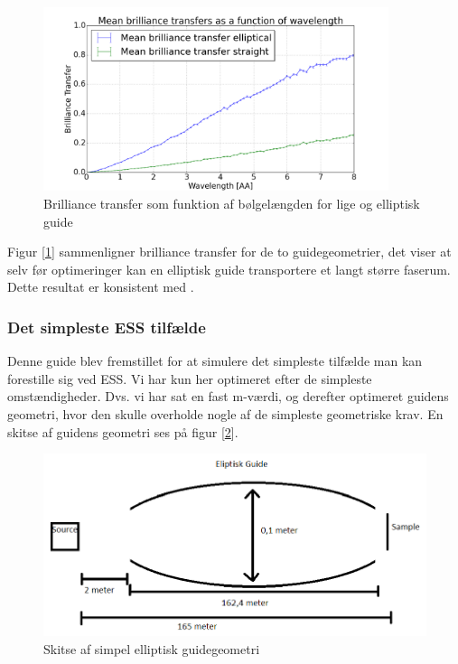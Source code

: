 \documentclass[12pt,oneside,a4paper]{article}
\begin{document}
{{{{{\begin{figure}[H]
\centering
\includegraphics[width=0.9\textwidth]{st_vs_elip_148950055477097.png}
\caption{Brilliance transfer som funktion af bølgelængden for lige og elliptisk guide} \label{st_vs_elip}
\end{figure}
Figur [\ref{st_vs_elip}] sammenligner brilliance transfer for de to guidegeometrier, det viser at selv før optimeringer kan en elliptisk guide transportere et langt større faserum. Dette resultat er konsistent med \cite{Kleno201275}.

\subsubsection{Det simpleste ESS tilfælde}
Denne guide blev fremstillet for at simulere det simpleste tilfælde man kan forestille sig ved ESS. Vi har kun her optimeret efter de simpleste omstændigheder. Dvs. vi har sat en fast m-værdi, og derefter optimeret guidens geometri, hvor den skulle overholde nogle af de simpleste geometriske krav.
En skitse af guidens geometri ses på figur [\ref{Ellipse}].
\begin{figure}[H]
\centering
\includegraphics[width=1\textwidth]{Elipse.png}
\caption{Skitse af simpel elliptisk guidegeometri} \label{Ellipse}
\end{figure}

}}}}}
\end{document}

